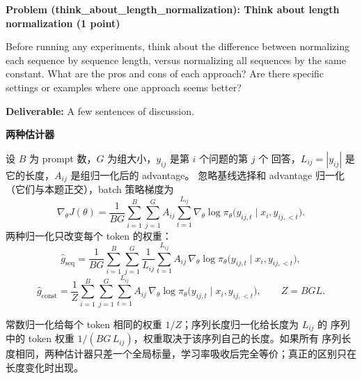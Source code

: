 \documentclass[UTF8,fontset=none,11pt,a4paper]{ctexart}
\begin{document}
\begin{tcolorbox}[
  colback=white,
  colframe=deepgreen,
  boxrule=0.8pt,
  arc=1mm,
  left=4mm,
  right=4mm,
  top=3mm,
  bottom=3mm
]
\textcolor{deepgreen}{\textbf{Problem (think\_about\_length\_normalization):
Think about length normalization (1 point)}}
\par\medskip
Before running any experiments, think about the difference between normalizing
each sequence by sequence length, versus normalizing all sequences by the same
constant. What are the pros and cons of each approach? Are there specific
settings or examples where one approach seems better?
\par\smallskip
\textbf{Deliverable:} A few sentences of discussion.
\end{tcolorbox}

{\large\bfseries\color{deepgreen} 两种估计器}\par\smallskip

设 \(B\) 为 prompt 数，\(G\) 为组大小，\(y_{ij}\) 是第 \(i\) 个问题的第 \(j\) 个
回答，\(L_{ij}=|y_{ij}|\) 是它的长度，\(A_{ij}\) 是组归一化后的 advantage。
忽略基线选择和 advantage 归一化（它们与本题正交），batch 策略梯度为
\begin{equation*}
\nabla_\theta J(\theta)
=
\frac{1}{BG}\sum_{i=1}^{B}\sum_{j=1}^{G}
A_{ij}\sum_{t=1}^{L_{ij}}
\nabla_\theta \log \pi_\theta
\bigl(y_{ij,t}\mid x_i,y_{ij,<t}\bigr).
\end{equation*}
两种归一化只改变每个 token 的权重：
\begin{equation}
\tag{28}
\hat g_{\mathrm{seq}}
=
\frac{1}{BG}\sum_{i=1}^{B}\sum_{j=1}^{G}
\frac{1}{L_{ij}}\sum_{t=1}^{L_{ij}}
A_{ij}\,\nabla_\theta \log \pi_\theta
\bigl(y_{ij,t}\mid x_i,y_{ij,<t}\bigr),
\end{equation}
\begin{equation}
\tag{33}
\hat g_{\mathrm{const}}
=
\frac{1}{Z}\sum_{i=1}^{B}\sum_{j=1}^{G}\sum_{t=1}^{L_{ij}}
A_{ij}\,\nabla_\theta \log \pi_\theta
\bigl(y_{ij,t}\mid x_i,y_{ij,<t}\bigr),
\qquad Z=BGL.
\end{equation}

常数归一化给每个 token 相同的权重 \(1/Z\)；序列长度归一化给长度为 \(L_{ij}\) 的
序列中的 token 权重 \(1/(BG\,L_{ij})\)，权重取决于该序列自己的长度。如果所有
序列长度相同，两种估计器只差一个全局标量，学习率吸收后完全等价；真正的区别只在
长度变化时出现。
\end{document}
